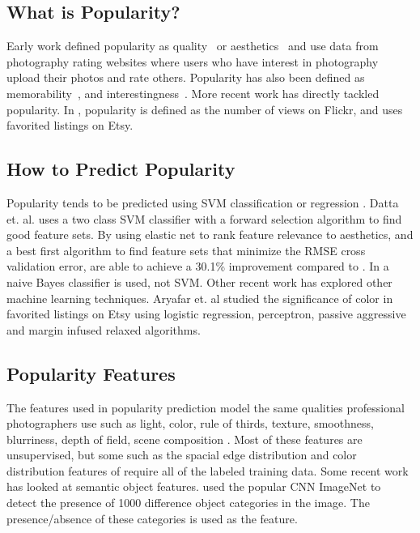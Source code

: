\documentclass[conference,a4paper]{IEEEtran}
\begin{document}
\subsection{What is Popularity?}
Early work defined popularity as quality~\cite{ke2006design} or aesthetics~\cite{datta2006studying} and use data from photography rating websites where users who have interest in photography upload their photos and rate others.  Popularity has also been defined as memorability~\cite{isola2011makes}, and interestingness~\cite{dhar2011high,gygli2013interestingness}.  More recent work has directly tackled popularity.  In \cite{khosla2014makes}, popularity is defined as the number of views on Flickr, and \cite{aryafar2014exploring} uses favorited listings on Etsy.

\subsection{How to Predict Popularity}
Popularity tends to be predicted using SVM classification or regression \cite{datta2006studying} \cite{khosla2014makes} \cite{chen2014aesthetic} \cite{wang15automatic}.  Datta et. al. \cite{datta2006studying} uses a two class SVM classifier with a forward selection algorithm to find good feature sets.  By using elastic net to rank feature relevance to aesthetics, and a best first algorithm to find feature sets that minimize the RMSE cross validation error, \cite{wang2015automatic} are able to achieve a 30.1\% improvement compared to \cite{chen2014aesthetic}.  In \cite{ke2006design} a naive Bayes classifier is used, not SVM.  Other recent work has explored other machine learning techniques.  Aryafar et. al \cite{aryafar2014exploring} studied the significance of color in favorited listings on Etsy using logistic regression, perceptron, passive aggressive and margin infused relaxed algorithms.

\subsection{Popularity Features}
The features used in popularity prediction model the same qualities professional photographers use such as light, color, rule of thirds, texture, smoothness, blurriness, depth of field, scene composition \cite{ke2006design} \cite{datta2006studying} \cite{chen2014aesthetic} \cite{wang2015automatic}.  Most of these features are unsupervised, but some such as the spacial edge distribution and color distribution features of \cite{ke2006design} require all of the labeled training data.  Some recent work has looked at semantic object features.  \cite{khosla2014makes} used the popular CNN ImageNet to detect the presence of 1000 difference object categories in the image.  The presence/absence of these categories is used as the feature.
\end{document}
